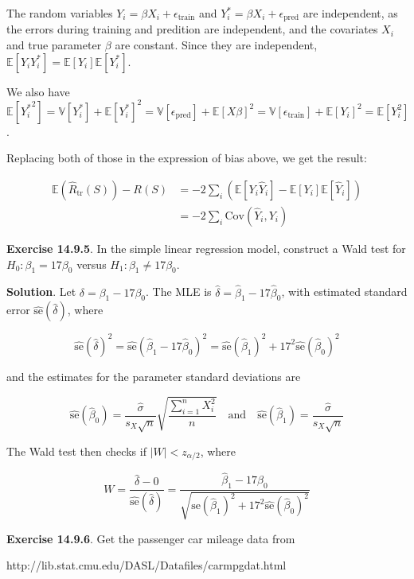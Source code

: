 The random variables \(Y_i = \beta X_i + \epsilon_\text{train}\) and
\(Y_i^* = \beta X_i + \epsilon_\text{pred}\) are independent, as the
errors during training and predition are independent, and the covariates
\(X_i\) and true parameter \(\beta\) are constant. Since they are
independent,
\(\mathbb{E}[Y_i Y_i^*] = \mathbb{E}[Y_i] \mathbb{E}[Y_i^*]\).

We also have
\(\mathbb{E} [ {Y_i^*}^2 ] = \mathbb{V}[Y_i^*] + \mathbb{E}[Y_i^*]^2 = \mathbb{V}[\epsilon_\text{pred}] + \mathbb{E}[X \beta]^2 = \mathbb{V}[\epsilon_\text{train}] + \mathbb{E}[Y_i]^2 = \mathbb{E} [Y_i^2]\).

Replacing both of those in the expression of bias above, we get the
result:

\begin{align}
\mathbb{E}(\hat{R}_\text{tr}(S)) - R(S) &= 
-2 \sum_i \left( \mathbb{E}[Y_i \hat{Y}_i] - \mathbb{E}[Y_i] \mathbb{E}[\hat{Y}_i] \right) \\
&= -2 \sum_i \text{Cov}(\hat{Y}_i, Y_i)
\end{align}

\textbf{Exercise 14.9.5}. In the simple linear regression model,
construct a Wald test for \(H_0 : \beta_1 = 17 \beta_0\) versus
\(H_1 : \beta_1 \neq 17 \beta_0\).

\textbf{Solution}. Let \(\delta = \beta_1 - 17 \beta_0\). The MLE is
\(\hat{\delta} = \hat{\beta}_1 - 17 \hat{\beta}_0\), with estimated
standard error \(\hat{\text{se}}(\hat{\delta})\), where

\[\hat{\text{se}}(\hat{\delta})^2 = \hat{\text{se}}(\hat{\beta}_1 - 17 \hat{\beta}_0)^2 = \hat{\text{se}}(\hat{\beta}_1)^2 + 17^2 \hat{\text{se}}(\hat{\beta}_0)^2 \]

and the estimates for the parameter standard deviations are

\[
\hat{\text{se}}(\hat{\beta}_0) = \frac{\hat{\sigma}}{s_X \sqrt{n}} \sqrt{\frac{\sum_{i=1}^n X_i^2}{n}}
\quad \text{and} \quad
\hat{\text{se}}(\hat{\beta}_1) = \frac{\hat{\sigma}}{s_X \sqrt{n}}
\]

The Wald test then checks if \(|W| < z_{\alpha / 2}\), where

\[W = \frac{\hat{\delta} - 0}{\hat{\text{se}}(\hat{\delta})} 
= \frac{\hat{\beta}_1 - 17 \hat{\beta}_0}{\sqrt{\hat{\text{se}}(\hat{\beta}_1)^2 + 17^2 \hat{\text{se}}(\hat{\beta}_0)^2}}\]

\textbf{Exercise 14.9.6}. Get the passenger car mileage data from

http://lib.stat.cmu.edu/DASL/Datafiles/carmpgdat.html

